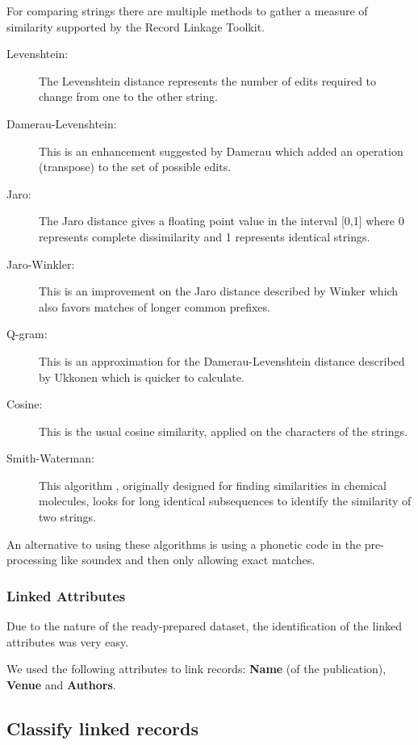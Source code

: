 \documentclass[sigconf,nonacm]{acmart}
\begin{document}
For comparing strings there are multiple methods to gather a measure
of similarity supported by the Record Linkage Toolkit.
\begin{description}
\item[Levenshtein:]
The Levenshtein distance \cite{Levenshtein}
represents the number of edits required to change
from one to the other string.
\item[Damerau-Levenshtein:]
This is an enhancement suggested by Damerau \cite{Damerau} which
added an operation (transpose) to the set of possible edits.
\item[Jaro:]
The Jaro distance \cite{Jaro} gives a floating point value
in the interval [0,1] where 0 represents complete dissimilarity and 1
represents identical strings.
\item[Jaro-Winkler:]
This is an improvement on the Jaro distance described by Winker \cite{Winkler}
which also favors matches of longer common prefixes.
\item[Q-gram:]
This is an approximation for the Damerau-Levenshtein distance
described by Ukkonen \cite{Ukkonen}
which is quicker to calculate.
\item[Cosine:]
This is the usual cosine similarity, applied on the characters of
the strings.
\item[Smith-Waterman:]
This algorithm \cite{Smith-Waterman}, originally designed for finding similarities in
chemical molecules, looks for long identical subsequences to identify the similarity
of two strings.
\end{description}

An alternative to using these algorithms is using a phonetic code in
the pre-processing like soundex and then only allowing exact matches.

\subsubsection{Linked Attributes}

Due to the nature of the ready-prepared dataset, the identification of the
linked attributes was very easy.

We used the following attributes to link records:
\textbf{Name} (of the publication), \textbf{Venue} and \textbf{Authors}.

\subsection{Classify linked records}
\end{document}
